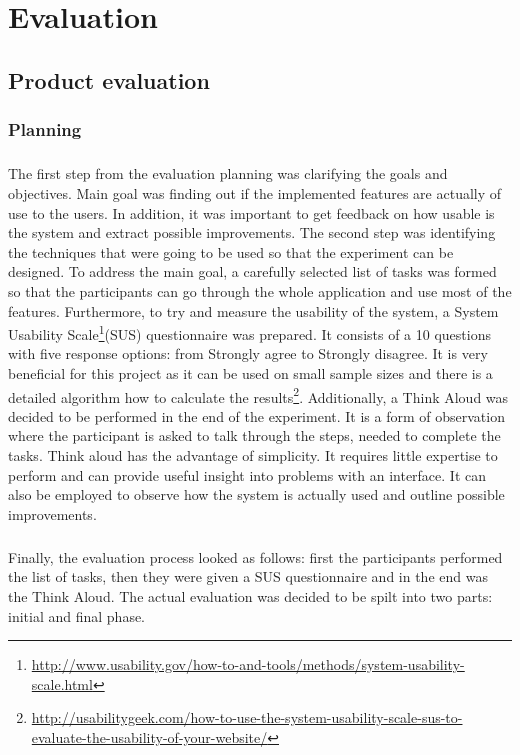 \documentclass{l4proj}
\begin{document}
{\chapter{Evaluation}

\section{Product evaluation}

\subsection{Planning}
\paragraph{}
The first step from the evaluation planning was clarifying the goals and objectives. Main goal was finding out if the implemented features are actually of use to the users. In addition, it was important to get feedback on how usable is the system and extract possible improvements. The second step was identifying the techniques that were going to be used so that the experiment can be designed. To address the main goal,  a carefully selected list of tasks was formed so that the participants can go through the whole application and use most of the features. Furthermore, to try and measure the usability of the system, a System Usability Scale\footnote{\url{http://www.usability.gov/how-to-and-tools/methods/system-usability-scale.html}}(SUS) questionnaire was prepared. It consists of a 10 questions with five response options: from Strongly agree to Strongly disagree. It is very beneficial for this project as it can be used on small sample sizes and there is a detailed algorithm how to calculate the results\footnote{\url{http://usabilitygeek.com/how-to-use-the-system-usability-scale-sus-to-evaluate-the-usability-of-your-website/}}. Additionally, a Think Aloud was decided to be performed in the end of the experiment. It is a form of observation where the participant is asked to talk through the steps, needed to complete the tasks\cite{hci}. Think aloud has the advantage of simplicity. It requires little expertise to perform and can provide useful insight into problems with an interface. It can also be employed to observe how the system is actually used and outline possible improvements.
\paragraph{} 
 Finally, the evaluation process looked as follows: first the participants performed the list of tasks, then they were given a SUS questionnaire and in the end was the Think Aloud. The actual evaluation was decided to be spilt into two parts: initial and final phase.
}
\end{document}
